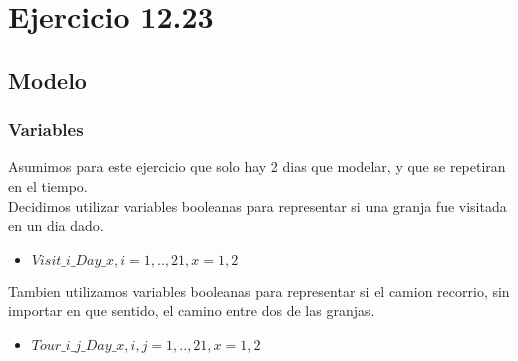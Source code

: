 \section{Ejercicio 12.23}
\subsection{Modelo}
\subsubsection{Variables}
Asumimos para este ejercicio que solo hay 2 dias que modelar, y que se repetiran en el tiempo. \\
Decidimos utilizar variables booleanas para representar si una granja fue visitada en un dia dado.
\begin{itemize}
\item $Visit\_i\_Day\_x,  i = 1, .. ,21, x = 1,2$
\end{itemize}
Tambien utilizamos variables booleanas para representar si el camion recorrio, sin importar en que sentido, el camino entre dos de las granjas.
\begin{itemize}
\item $Tour\_i\_j\_Day\_x,  i,j = 1, .. ,21, x = 1,2 $
\end{itemize}
